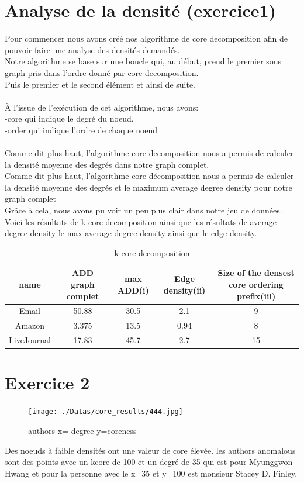 \documentclass[a4paper,10pt]{report}
\begin{document}
\section{Analyse de la densité (exercice1)}
Pour commencer nous avons créé nos algorithme de core decomposition afin de pouvoir faire une analyse des densités demandés.
\\
Notre algorithme se base sur une boucle qui, au début, prend le premier sous graph pris dans l'ordre donné par core decomposition.\\
Puis le premier et le second élément et ainsi de suite.
\\
\\
À l'issue de l'exécution de cet algorithme, nous avons:\\
\indent -core qui indique le degré du noeud.\\
\indent -order qui indique l'ordre de chaque noeud
        \\
        \\
Comme dit plus haut, l'algorithme core decomposition nous a permis de calculer la densité moyenne des degrés dans notre graph complet.
\\
Comme dit plus haut, l'algorithme core décomposition nous a permis de calculer la densité moyenne des degrés et le maximum average degree density pour notre graph complet 
\\
Grâce à cela, nous avons pu voir un peu plus clair dans notre jeu de données.
\clearpage
Voici les résultats de k-core decomposition ainsi que les résultats de average degree density le max average degree density ainsi que le edge density.
\begin{table}[ht]
\caption{k-core decomposition}
\centering
\begin{tabular}{|c c c c c|}
\hline\hline
name & ADD graph complet & max ADD(i) & Edge density(ii) & Size of the densest core ordering prefix(iii) \\[0.5ex]
\hline

Email & 50.88 & 30.5 & 2.1 & 9 \\
Amazon & 3.375 & 13.5 & 0.94 & 8 \\
LiveJournal & 17.83 & 45.7 & 2.7 & 15  \\

\hline
\end{tabular}
\label {table:nonlin}
\end{table}



\section{Exercice 2}
\begin{figure}[H]
  \caption{authors x= degree y=coreness}
  \centering
    \texttt{[image: ./Datas/core\_results/444.jpg]}    
\end{figure}
Des noeuds à faible densités ont une valeur de core élevée. les authors anomalous sont des points avec un kcore de 100 et un degré de 35 qui est pour Myunggwon Hwang et pour la personne avec le x=35 et y=100 est monsieur Stacey D. Finley. 
\end{document}
